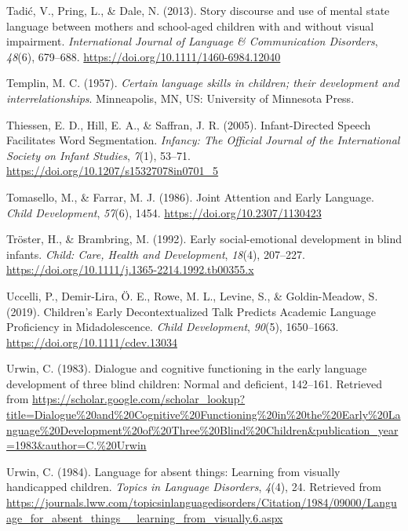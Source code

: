 \documentclass[
  man]{apa6}
\newlength{\cslhangindent}
\newlength{\cslentryspacingunit} %
\newenvironment{CSLReferences}[2] %
 {%
  \setlength{\parindent}{0pt}
  \ifodd #1
  \let\oldpar\par
  \def\par{\hangindent=\cslhangindent\oldpar}
  \fi
  \setlength{\parskip}{#2\cslentryspacingunit}
 }%
 {}
\begin{document}
\begin{CSLReferences}{1}{0}
\leavevmode{}%
Tadić, V., Pring, L., \& Dale, N. (2013). Story discourse and use of mental state language between mothers and school-aged children with and without visual impairment. \emph{International Journal of Language \& Communication Disorders}, \emph{48}(6), 679--688. \url{https://doi.org/10.1111/1460-6984.12040}

\leavevmode{}%
Templin, M. C. (1957). \emph{Certain language skills in children; their development and interrelationships}. Minneapolis, MN, US: University of Minnesota Press.

\leavevmode{}%
Thiessen, E. D., Hill, E. A., \& Saffran, J. R. (2005). Infant-{Directed} {Speech} {Facilitates} {Word} {Segmentation}. \emph{Infancy: The Official Journal of the International Society on Infant Studies}, \emph{7}(1), 53--71. \url{https://doi.org/10.1207/s15327078in0701_5}

\leavevmode{}%
Tomasello, M., \& Farrar, M. J. (1986). Joint {Attention} and {Early} {Language}. \emph{Child Development}, \emph{57}(6), 1454. \url{https://doi.org/10.2307/1130423}

\leavevmode{}%
Tröster, H., \& Brambring, M. (1992). Early social-emotional development in blind infants. \emph{Child: Care, Health and Development}, \emph{18}(4), 207--227. \url{https://doi.org/10.1111/j.1365-2214.1992.tb00355.x}

\leavevmode{}%
Uccelli, P., Demir-Lira, Ö. E., Rowe, M. L., Levine, S., \& Goldin-Meadow, S. (2019). Children's {Early} {Decontextualized} {Talk} {Predicts} {Academic} {Language} {Proficiency} in {Midadolescence}. \emph{Child Development}, \emph{90}(5), 1650--1663. \url{https://doi.org/10.1111/cdev.13034}

\leavevmode{}%
Urwin, C. (1983). Dialogue and cognitive functioning in the early language development of three blind children: {Normal} and deficient, 142--161. Retrieved from \url{https://scholar.google.com/scholar_lookup?title=Dialogue\%20and\%20Cognitive\%20Functioning\%20in\%20the\%20Early\%20Language\%20Development\%20of\%20Three\%20Blind\%20Children\&publication_year=1983\&author=C.\%20Urwin}

\leavevmode{}%
Urwin, C. (1984). Language for absent things: Learning from visually handicapped children. \emph{Topics in Language Disorders}, \emph{4}(4), 24. Retrieved from \url{https://journals.lww.com/topicsinlanguagedisorders/Citation/1984/09000/Language_for_absent_things__learning_from_visually.6.aspx}


\end{CSLReferences}
\end{document}

